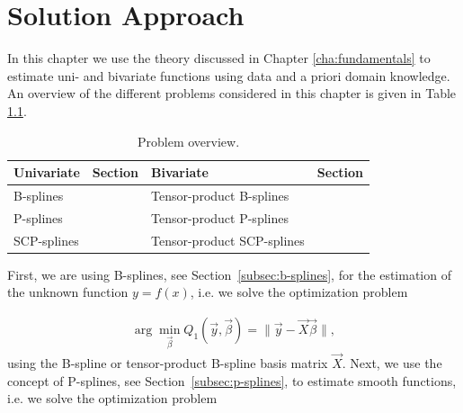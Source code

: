 \documentclass[10pt,a4paper]{report}
\begin{document}


\chapter{Solution Approach} \label{cha:solution-approach}

In this chapter we use the theory discussed in Chapter \ref{cha:fundamentals} to estimate uni- and bivariate  functions using data and a priori domain knowledge. An overview of the different problems considered in this chapter is given in Table \ref{tab:problem_overview}. 

\begin{table}[H]
	\centering
	\begin{tabular}{|l|l|l|l|}
		\hline
		\textbf{Univariate}   & \textbf{Section} & \textbf{Bivariate}         & \textbf{Section} \\ \hline \toprule
		B-splines             &                & Tensor-product B-splines   &               \\ \hline
		P-splines             &                & Tensor-product P-splines   &              \\ \hline
		SCP-splines           & 			   & Tensor-product SCP-splines &     \\ \hline \bottomrule
	\end{tabular}
	\caption{Problem overview.}
	\label{tab:problem_overview}
\end{table}
%
First, we are using B-splines, see Section~\ref{subsec:b-splines}, for the estimation of the unknown function $y = f(x)$, i.e. we solve the optimization problem

\begin{align} \label{eq:OF-B-splines}
	\arg \min_{\vec{\beta}} Q_1(\vec{y}, \vec{\beta}) = \lVert \vec{y} - \vec{X} \vec{\beta} \rVert,
\end{align}
%
using the B-spline or tensor-product B-spline basis matrix $\vec{X}$. Next, we use the concept of P-splines, see Section~\ref{subsec:p-splines}, to estimate smooth functions, i.e. we solve the optimization problem
\end{document}
